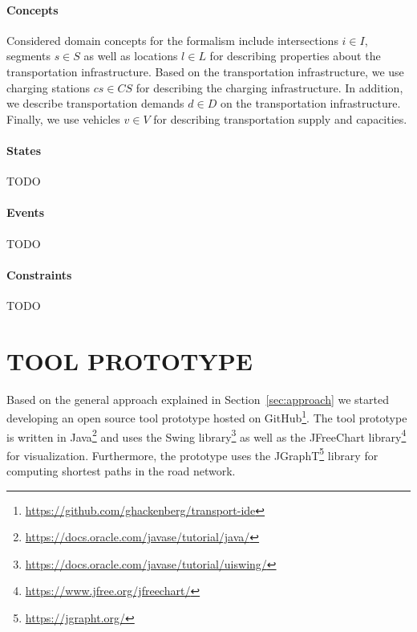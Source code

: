 \documentclass[a4paper,twoside]{article}
\begin{document}
	\paragraph{Concepts}
	
	Considered domain concepts for the formalism include intersections $i \in I$, segments $s \in S$ as well as locations $l \in L$ for describing properties about the transportation infrastructure.
	Based on the transportation infrastructure, we use charging stations $cs \in CS$ for describing the charging infrastructure. In addition, we describe transportation demands $d \in D$ on the transportation infrastructure.
	Finally, we use vehicles $v \in V$ for describing transportation supply and capacities.
	
	\paragraph{States}
	
	TODO
	
	\paragraph{Events}
	
	TODO
	
	\paragraph{Constraints}
	
	TODO
	
	\section{\uppercase{Tool prototype}}
	\label{sec:tool-prototype}
	
	Based on the general approach explained in Section~\ref{sec:approach} we started developing an open source tool prototype hosted on GitHub\footnote{\url{https://github.com/ghackenberg/transport-ide}}.
	The tool prototype is written in Java\footnote{\url{https://docs.oracle.com/javase/tutorial/java/}} and uses the Swing library\footnote{\url{https://docs.oracle.com/javase/tutorial/uiswing/}} as well as the JFreeChart library\footnote{\url{https://www.jfree.org/jfreechart/}} for visualization.
	Furthermore, the prototype uses the JGraphT\footnote{\url{https://jgrapht.org/}} library for computing shortest paths in the road network.
	
\end{document}
